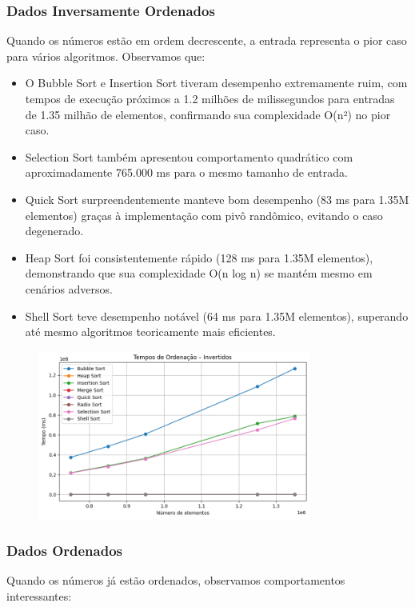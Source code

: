 \documentclass[a4paper, 12pt]{article}
\begin{document}
        \subsubsection{Dados Inversamente Ordenados}
            Quando os números estão em ordem decrescente, a entrada representa o pior caso para vários algoritmos. Observamos que:

            \begin{itemize}
                \item O Bubble Sort e Insertion Sort tiveram desempenho extremamente ruim, com tempos de execução próximos a 1.2 milhões de milissegundos para entradas de 1.35 milhão de elementos, confirmando sua complexidade O(n²) no pior caso.
                \item Selection Sort também apresentou comportamento quadrático com aproximadamente 765.000 ms para o mesmo tamanho de entrada.
                \item Quick Sort surpreendentemente manteve bom desempenho (83 ms para 1.35M elementos) graças à implementação com pivô randômico, evitando o caso degenerado.
                \item Heap Sort foi consistentemente rápido (128 ms para 1.35M elementos), demonstrando que sua complexidade O(n log n) se mantém mesmo em cenários adversos.
                \item Shell Sort teve desempenho notável (64 ms para 1.35M elementos), superando até mesmo algoritmos teoricamente mais eficientes.
            \end{itemize}

            \begin{figure}[ht]
                \centering
                \includegraphics[width=0.8\textwidth]{images/invertidos.png}
            \end{figure}

        \subsubsection{Dados Ordenados}
            Quando os números já estão ordenados, observamos comportamentos interessantes:
\end{document}
